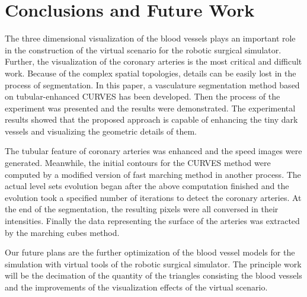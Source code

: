 \section{Conclusions and Future Work}

The three dimensional visualization of the blood vessels plays an important role in the construction of the virtual scenario for the robotic surgical simulator.
Further, the visualization of the coronary arteries is the most critical and difficult work.
Because of the complex spatial topologies, details can be easily lost in the process of segmentation.
In this paper, a vasculature segmentation method based on tubular-enhanced CURVES has been developed.
Then the process of the experiment was presented and the results were demonstrated.
The experimental results showed that the proposed approach is capable of enhancing the tiny dark vessels and visualizing the geometric details of them.

The tubular feature of coronary arteries was enhanced and the speed images were generated.
Meanwhile, the initial contours for the CURVES method were computed by a modified version of fast marching method in another process.
The actual level sets evolution began after the above computation finished and the evolution took a specified number of iterations to detect the coronary arteries.
At the end of the segmentation, the resulting pixels were all conversed in their intensities.
Finally the data representing the surface of the arteries was extracted by the marching cubes method.

Our future plans are the further optimization of the blood vessel models for the simulation with virtual tools of the robotic surgical simulator.
The principle work will be the decimation of the quantity of the triangles consisting the blood vessels and the improvements of the visualization effects of the virtual scenario.